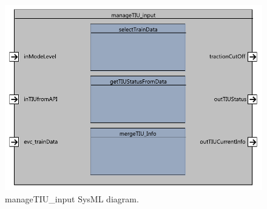 \begin{figure}
\center
\includegraphics[width=.7\textwidth]{images/F2_12_manageTIU_input.pdf}
\caption{manageTIU\_input SysML diagram.}\label{f:manageTIUInput}
\end{figure}

